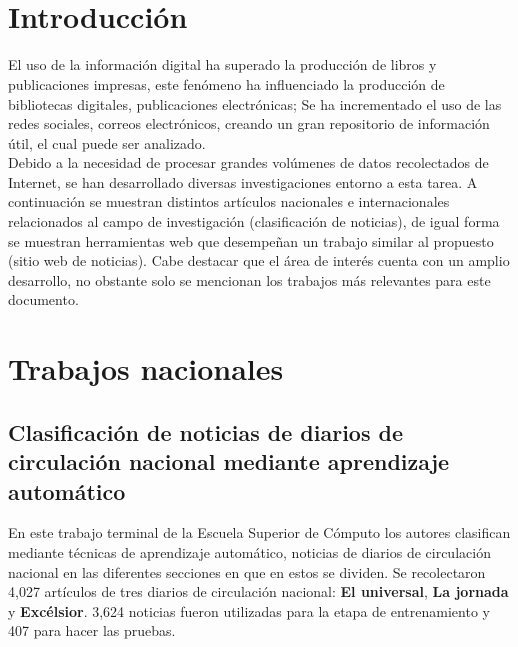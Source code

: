 \ \\\\
\section{Introducción}


El uso de la información digital ha superado la producción de libros y publicaciones impresas, este fenómeno ha influenciado la producción de bibliotecas digitales, publicaciones electrónicas; Se ha incrementado el uso de las redes sociales, correos electrónicos, creando un gran repositorio de información útil, el cual puede ser analizado\citep{CD1}.\\

Debido a la necesidad de procesar grandes volúmenes de datos recolectados de Internet, se han desarrollado diversas investigaciones entorno a esta tarea. A continuación se muestran distintos artículos nacionales e internacionales relacionados al campo de investigación (clasificación de noticias), de igual forma se muestran herramientas web que desempeñan un trabajo similar al propuesto (sitio web de noticias). Cabe destacar que el área de interés cuenta con un amplio desarrollo, no obstante solo se mencionan los trabajos más relevantes para este documento.


\section{Trabajos nacionales}


\begin{large}
	 \subsection[Clasificación de noticias de diarios]{Clasificación de noticias de diarios de circulación nacional mediante aprendizaje automático }
\end{large}


En este trabajo terminal de la Escuela Superior de Cómputo \citep{CD2} los autores clasifican mediante técnicas de aprendizaje automático, noticias de diarios de circulación nacional en las diferentes secciones en que en estos se dividen. Se recolectaron 4,027 artículos de tres diarios de circulación nacional: \textbf{El universal}, \textbf{La jornada} y \textbf{Excélsior}. 3,624 noticias fueron utilizadas para la etapa de entrenamiento y 407 para hacer las pruebas.\\


